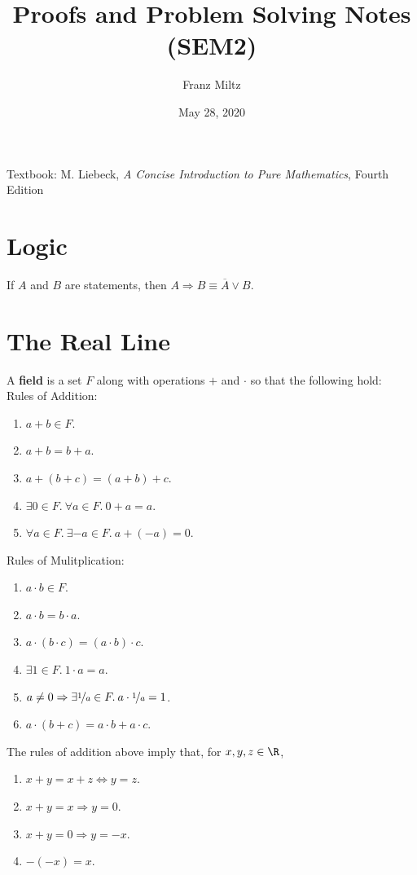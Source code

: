 \documentclass{article}
\begin{document}
\title{Proofs and Problem Solving Notes (SEM2)}
\author{Franz Miltz}
\date{May 28, 2020}
\maketitle
\noindent Textbook: M. Liebeck, \emph{A Concise Introduction to Pure Mathematics}, Fourth Edition
\mkthms
\tableofcontents
\pagebreak
\section{Logic}
\begin{theorem}
	If $A$ and $B$ are statements, then $A\Rightarrow B\equiv \overline{A}\vee B$.
\end{theorem}
\section{The Real Line}
\begin{definition}
	A \textbf{field} is a set $F$ along with operations $+$ and $\cdot$ so that the following hold:\\
	Rules of Addition:
	\begin{enumerate}
		\item $a+b\in F$.
		\item $a+b = b+a$.
		\item $a+(b+c) = (a+b)+c$.
		\item $\exists 0\in F.\: \forall a\in F.\: 0+a=a$.
		\item $\forall a\in F.\: \exists -a\in F.\: a+(-a)=0$.
	\end{enumerate}
	Rules of Mulitplication:
	\begin{enumerate}
		\item $a\cdot b \in F$.
		\item $a\cdot b = b\cdot a$.
		\item $a\cdot(b\cdot c)=(a\cdot b)\cdot c$.
		\item $\exists 1\in F.\: 1\cdot a = a$.
		\item $a\not=0\Rightarrow\exists \nicefrac{1}{a}\in F.\: a\cdot\nicefrac{1}{a}=1$.
		\item $a\cdot (b+c) = a\cdot b + a\cdot c$.
	\end{enumerate}
\end{definition}
\begin{theorem}
	The rules of addition above imply that, for $x,y,z\in \R$,
	\begin{enumerate}
		\item $x+y=x+z\Leftrightarrow y=z$.
		\item $x+y=x\Rightarrow y=0$.
		\item $x+y=0\Rightarrow y=-x$.
		\item $-(-x)=x$.
	\end{enumerate}
\end{theorem}
\end{document}
